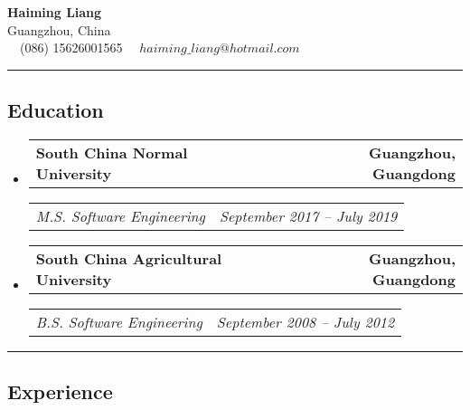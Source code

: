 \documentclass[11pt,letterpaper]{article}
\makeatletter
\newcommand{\headerrow}[2]
{\begin{tabular*}{\linewidth}{l@{\extracolsep{\fill}}r}
#1 &
#2 \\
\end{tabular*}}
\makeatother
\begin{document}
\begin{center}
	{\LARGE \textbf{Haiming Liang}}\\
	Guangzhou, China
	\vspace{0.05cm}
	\\
	\raisebox{-0.2\height} {\Large \faPhoneSquare} \ \  (086) 15626001565 \hfill\raisebox{-0.2\height}{\Large \faEnvelopeSquare} \ \ $haiming\_liang@hotmail.com$
\end{center}

\hrule
\vspace{-1em}

\subsection*{\Large Education}

\begin{itemize}[leftmargin=1em]
	\parskip=0.1em
		
	\item
	      \headerrow
	      {\textbf{South China Normal University}}
	      {\textbf{Guangzhou, Guangdong}}
	      \headerrow
	      {\emph{M.S. Software Engineering}}
	      {\emph{September 2017 -- July 2019}}
    \item
            \headerrow
	      {\textbf{South China Agricultural University}}
	      {\textbf{Guangzhou, Guangdong}}
	      \headerrow
	      {\emph{B.S. Software Engineering}}
	      {\emph{September 2008 -- July 2012}}
	      	      
\end{itemize}
\hrule
\vspace{-1em}
\subsection*{\Large Experience}
\end{document}
